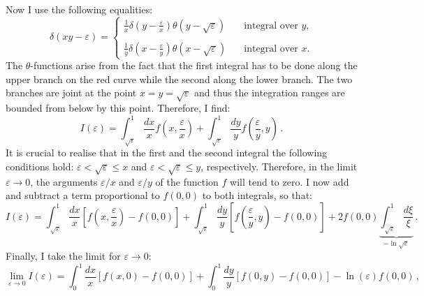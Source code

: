 \documentclass[10pt,a4paper]{article}
\begin{document}
Now I use the following equalities:
\begin{equation}
\delta(xy-\varepsilon) = \left\{
\begin{array}{ll}
\displaystyle \frac{1}{x}\delta\left(y-\frac{\varepsilon}{x}\right)\theta(y-\sqrt{\varepsilon}) &
                                                                      \quad\mbox{integral
                                                                      over
                                                                      $y$,}\\
\\
\displaystyle \frac{1}{y}\delta\left(x-\frac{\varepsilon}{y}\right) \theta(x-\sqrt{\varepsilon}) &
                                                                      \quad\mbox{integral
                                                                      over
                                                                      $x$.}
\end{array}
\right.
\end{equation}
The $\theta$-functions arise from the fact that the first integral has
to be done along the upper branch on the red curve while the second
along the lower branch. The two branches are joint at the point
$x=y=\sqrt{\varepsilon}$ and thus the integration ranges are bounded
from below by this point. Therefore, I find:
\begin{equation}
I(\varepsilon) =\int_{\sqrt{\varepsilon}}^1
\frac{dx}{x}f\left(x,\frac{\varepsilon}{x}\right) + \int_{\sqrt{\varepsilon}}^1 \frac{dy}{y}f\left(\frac{\varepsilon}{y},y\right)\,.
\end{equation}
It is crucial to realise that in the first and the second integral the
following conditions hold: $\varepsilon < \sqrt{\varepsilon}\leq x$
and $\varepsilon < \sqrt{\varepsilon}\leq y$, respectively. Therefore,
in the limit $\varepsilon\rightarrow 0$, the arguments $\varepsilon/x$
and $\varepsilon/y$ of the function $f$ will tend to zero. I now add
and subtract a term proportional to $f(0,0)$ to both integrals, so
that:
\begin{equation}
I(\varepsilon) =\int_{\sqrt{\varepsilon}}^1
\frac{dx}{x}\left[f\left(x,\frac{\varepsilon}{x}\right)-f(0,0)\right] + \int_{\sqrt{\varepsilon}}^1 \frac{dy}{y}\left[f\left(\frac{\varepsilon}{y},y\right)-f(0,0)\right]+2f(0,0) \underbrace{\int_{\sqrt{\varepsilon}}^1 \frac{d\xi}{\xi}}_{-\ln\sqrt{\varepsilon}}\,.
\end{equation}
Finally, I take the limit for $\varepsilon\rightarrow 0$:
\begin{equation}
\lim_{\varepsilon\rightarrow 0}I(\varepsilon) =\int_0^1
\frac{dx}{x}\left[f\left(x,0\right)-f(0,0)\right] + \int_{0}^1 \frac{dy}{y}\left[f\left(0,y\right)-f(0,0)\right]-\ln\left(\varepsilon\right) f(0,0)\,,
\end{equation}
\end{document}
